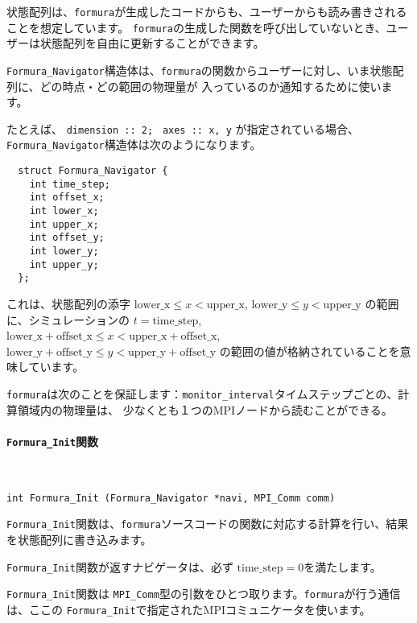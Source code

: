 \documentclass{jsarticle}
\newcommand{\formura}{{\texttt{formura}}}
\begin{document}
状態配列は、\formura が生成したコードからも、ユーザーからも読み書きされることを想定しています。
\formura の生成した関数を呼び出していないとき、ユーザーは状態配列を自由に更新することができます。

\verb`Formura_Navigator`構造体は、\formura の関数からユーザーに対し、いま状態配列に、どの時点・どの範囲の物理量が
入っているのか通知するために使います。

たとえば、
\verb`dimension :: 2; `
\verb`axes :: x, y`
が指定されている場合、
\verb`Formura_Navigator`構造体は次のようになります。

\begin{screen}
\begin{verbatim}
  struct Formura_Navigator {
    int time_step;
    int offset_x;
    int lower_x;
    int upper_x;
    int offset_y;
    int lower_y;
    int upper_y;
  };
\end{verbatim}
\end{screen}

これは、状態配列の添字
$\mathrm{lower\_x} \leq x < \mathrm{upper\_x}$,
$\mathrm{lower\_y} \leq y < \mathrm{upper\_y}$
の範囲に、シミュレーションの
$t = \mathrm{time\_step}$,
$\mathrm{lower\_x} + \mathrm{offset\_x} \leq x < \mathrm{upper\_x} + \mathrm{offset\_x}$,
$\mathrm{lower\_y} + \mathrm{offset\_y} \leq y < \mathrm{upper\_y} + \mathrm{offset\_y}$
の範囲の値が格納されていることを意味しています。



\formura は次のことを保証します：\verb`monitor_interval`タイムステップごとの、計算領域内の物理量は、
少なくとも１つのMPIノードから読むことができる。


\paragraph{\texttt{Formura\_Init}関数} \leavevmode\\

\begin{screen}
\begin{verbatim}
int Formura_Init (Formura_Navigator *navi, MPI_Comm comm)
\end{verbatim}
\end{screen}
\verb`Formura_Init`関数は、\formura ソースコードの関数に対応する計算を行い、結果を状態配列に書き込みます。

\verb`Formura_Init`関数が返すナビゲータは、必ず
$\mathrm{time\_step} = 0$を満たします。


\verb`Formura_Init`関数は
\verb`MPI_Comm`型の引数をひとつ取ります。\formura が行う通信は、ここの
\verb`Formura_Init`で指定されたMPIコミュニケータを使います。
\end{document}
